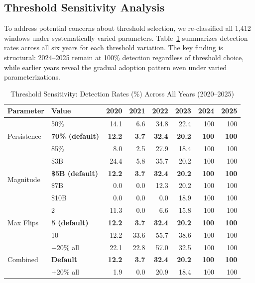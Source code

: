 \subsection{Threshold Sensitivity Analysis}

To address potential concerns about threshold selection, we re-classified all 1,412 windows under systematically varied parameters. Table~\ref{tab:sensitivity} summarizes detection rates across all six years for each threshold variation. The key finding is structural: 2024--2025 remain at 100\% detection regardless of threshold choice, while earlier years reveal the gradual adoption pattern even under varied parameterizations.

\begin{table}[!htbp]
\centering
\caption{Threshold Sensitivity: Detection Rates (\%) Across All Years (2020--2025)}
\label{tab:sensitivity}
\footnotesize
\begin{tabular}{@{}llrrrrrr@{}}
\toprule
\textbf{Parameter} & \textbf{Value} & \textbf{2020} & \textbf{2021} & \textbf{2022} & \textbf{2023} & \textbf{2024} & \textbf{2025} \\
\midrule
\multirow{3}{*}{Persistence} & 50\% & 14.1 & 6.6 & 34.8 & 22.4 & 100 & 100 \\
& \textbf{70\% (default)} & \textbf{12.2} & \textbf{3.7} & \textbf{32.4} & \textbf{20.2} & \textbf{100} & \textbf{100} \\
& 85\% & 8.0 & 2.5 & 27.9 & 18.4 & 100 & 100 \\
\midrule
\multirow{4}{*}{Magnitude} & \$3B & 24.4 & 5.8 & 35.7 & 20.2 & 100 & 100 \\
& \textbf{\$5B (default)} & \textbf{12.2} & \textbf{3.7} & \textbf{32.4} & \textbf{20.2} & \textbf{100} & \textbf{100} \\
& \$7B & 0.0 & 0.0 & 12.3 & 20.2 & 100 & 100 \\
& \$10B & 0.0 & 0.0 & 0.0 & 18.9 & 100 & 100 \\
\midrule
\multirow{3}{*}{Max Flips} & 2 & 11.3 & 0.0 & 6.6 & 15.8 & 100 & 100 \\
& \textbf{5 (default)} & \textbf{12.2} & \textbf{3.7} & \textbf{32.4} & \textbf{20.2} & \textbf{100} & \textbf{100} \\
& 10 & 12.2 & 33.6 & 55.7 & 38.6 & 100 & 100 \\
\midrule
\multirow{3}{*}{Combined} & $-$20\% all & 22.1 & 22.8 & 57.0 & 32.5 & 100 & 100 \\
& \textbf{Default} & \textbf{12.2} & \textbf{3.7} & \textbf{32.4} & \textbf{20.2} & \textbf{100} & \textbf{100} \\
& $+$20\% all & 1.9 & 0.0 & 20.9 & 18.4 & 100 & 100 \\
\bottomrule
\end{tabular}
\end{table}


